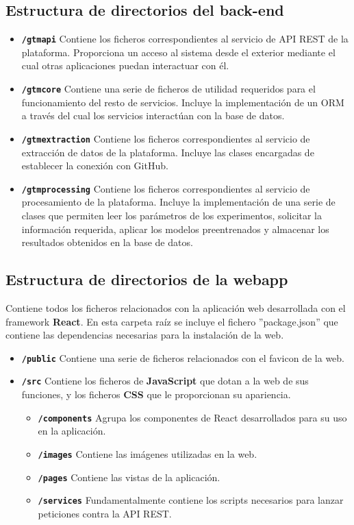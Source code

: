 \subsection{Estructura de directorios del back-end} \label{mp:backend}

\begin{itemize} [\textbullet]
    \item \textbf{\texttt{/gtmapi}} Contiene los ficheros correspondientes al servicio de API REST de la plataforma. Proporciona un acceso al sistema desde el exterior mediante el cual otras aplicaciones puedan interactuar con él.
    \item \textbf{\texttt{/gtmcore}} Contiene una serie de ficheros de utilidad requeridos para el funcionamiento del resto de servicios. Incluye la implementación de un ORM a través del cual los servicios interactúan con la base de datos.
    \item \textbf{\texttt{/gtmextraction}} Contiene los ficheros correspondientes al servicio de extracción de datos de la plataforma. Incluye las clases encargadas de establecer la conexión con GitHub.
    \item \textbf{\texttt{/gtmprocessing}} Contiene los ficheros correspondientes al servicio de procesamiento de la plataforma. Incluye la implementación de una serie de clases que permiten leer los parámetros de los experimentos, solicitar la información requerida, aplicar los modelos preentrenados y almacenar los resultados obtenidos en la base de datos.
\end{itemize}

\subsection{Estructura de directorios de la webapp} \label{mp:front-end}
Contiene todos los ficheros relacionados con la aplicación web desarrollada con el framework \textbf{React}. En esta carpeta raíz se incluye el fichero ''package.json'' que contiene las dependencias necesarias para la instalación de la web.

\begin{itemize} [\textbullet]
    \item \textbf{\texttt{/public}} Contiene una serie de ficheros relacionados con el favicon de la web.
    \item \textbf{\texttt{/src}} Contiene los ficheros de \textbf{JavaScript} que dotan a la web de sus funciones, y los ficheros \textbf{CSS} que le proporcionan su apariencia.
    \begin{itemize} [\textbullet]
        \item \textbf{\texttt{/components}} Agrupa los componentes de React desarrollados para su uso en la aplicación.
        \item \textbf{\texttt{/images}} Contiene las imágenes utilizadas en la web. 
        \item \textbf{\texttt{/pages}} Contiene las vistas de la aplicación.
        \item \textbf{\texttt{/services}} Fundamentalmente contiene los scripts necesarios para lanzar peticiones contra la API REST.
    \end{itemize}
\end{itemize}

